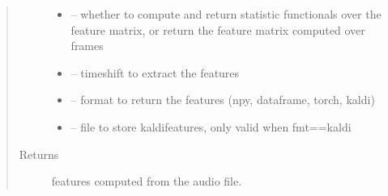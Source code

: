 \documentclass[letterpaper,10pt,english]{sphinxmanual}
\begin{document}
\begin{fulllineitems}
\begin{fulllineitems}
\begin{quote}
\begin{description}
\begin{itemize}
\item {} 
 -- whether to compute and return statistic functionals over the feature matrix, or return the feature matrix computed over frames

\item {} 
 -- timeshift to extract the features

\item {} 
 -- format to return the features (npy, dataframe, torch, kaldi)

\item {} 
 -- file to store kaldifeatures, only valid when fmt==\sphinxquotedblright{}kaldi\sphinxquotedblright{}

\end{itemize}

\item[{Returns}] \leavevmode
features computed from the audio file.

\end{description}\end{quote}


\end{fulllineitems}
\end{fulllineitems}
\end{document}
